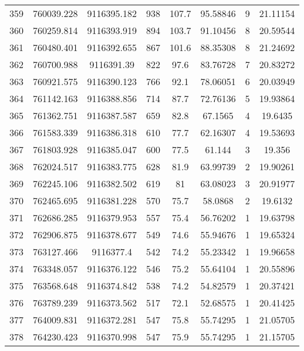 \begin{longtable}{cccccccc}
359  & 760039.228      & 9116395.182      & 938     & 107.7 & 95.58846 & 9  & 21.11154 \\
360  & 760259.814      & 9116393.919      & 894     & 103.7 & 91.10456 & 8  & 20.59544 \\
361  & 760480.401      & 9116392.655      & 867     & 101.6 & 88.35308 & 8  & 21.24692 \\
362  & 760700.988      & 9116391.39       & 822     & 97.6  & 83.76728 & 7  & 20.83272 \\
363  & 760921.575      & 9116390.123      & 766     & 92.1  & 78.06051 & 6  & 20.03949 \\
364  & 761142.163      & 9116388.856      & 714     & 87.7  & 72.76136 & 5  & 19.93864 \\
365  & 761362.751      & 9116387.587      & 659     & 82.8  & 67.1565  & 4  & 19.6435  \\
366  & 761583.339      & 9116386.318      & 610     & 77.7  & 62.16307 & 4  & 19.53693 \\
367  & 761803.928      & 9116385.047      & 600     & 77.5  & 61.144   & 3  & 19.356   \\
368  & 762024.517      & 9116383.775      & 628     & 81.9  & 63.99739 & 2  & 19.90261 \\
369  & 762245.106      & 9116382.502      & 619     & 81    & 63.08023 & 3  & 20.91977 \\
370  & 762465.695      & 9116381.228      & 570     & 75.7  & 58.0868  & 2  & 19.6132  \\
371  & 762686.285      & 9116379.953      & 557     & 75.4  & 56.76202 & 1  & 19.63798 \\
372  & 762906.875      & 9116378.677      & 549     & 74.6  & 55.94676 & 1  & 19.65324 \\
373  & 763127.466      & 9116377.4        & 542     & 74.2  & 55.23342 & 1  & 19.96658 \\
374  & 763348.057      & 9116376.122      & 546     & 75.2  & 55.64104 & 1  & 20.55896 \\
375  & 763568.648      & 9116374.842      & 538     & 74.2  & 54.82579 & 1  & 20.37421 \\
376  & 763789.239      & 9116373.562      & 517     & 72.1  & 52.68575 & 1  & 20.41425 \\
377  & 764009.831      & 9116372.281      & 547     & 75.8  & 55.74295 & 1  & 21.05705 \\
378  & 764230.423      & 9116370.998      & 547     & 75.9  & 55.74295 & 1  & 21.15705 \\

\end{longtable}
